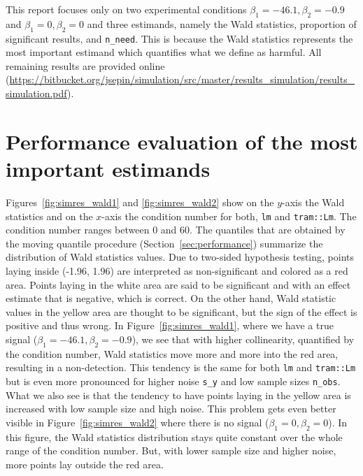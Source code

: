 \documentclass[11pt,a4paper,twoside]{book}\usepackage[]{graphicx}\usepackage[]{xcolor}
\begin{document}
This report focuses only on two experimental conditions $\beta_1=-46.1,\beta_2=-0.9$ and $\beta_1=0,\beta_2=0$ and three estimands, namely the Wald statistics, proportion of significant results, and \texttt{n\_need}.
This is because the Wald statistics represents the most important estimand which quantifies what we define as harmful.
All remaining results are provided online (\url{https://bitbucket.org/jsepin/simulation/src/master/results_simulation/results_simulation.pdf}).

\section{Performance evaluation of the most important estimands}
Figures~\ref{fig:simres_wald1} and \ref{fig:simres_wald2} show on the $y$-axis the Wald statistics and on the $x$-axis the condition number for both, \texttt{lm} and \texttt{tram::Lm}.
The condition number ranges between 0 and 60.
The quantiles that are obtained by the moving quantile procedure (Section~\ref{sec:performance}) summarize the distribution of Wald statistics values.
Due to two-sided hypothesis testing, points laying inside (-1.96, 1.96) are interpreted as non-significant and colored as a red area.
Points laying in the white area are said to be significant and with an effect estimate that is negative, which is correct. On the other hand, Wald statistic values in the yellow area are thought to be significant, but the sign of the effect is positive and thus wrong.
In Figure~\ref{fig:simres_wald1}, where we have a true signal ($\beta_1=-46.1,\beta_2=-0.9$), we see that with higher collinearity, quantified by the condition number, Wald statistics move more and more into the red area, resulting in a non-detection. This tendency is the same for both \texttt{lm} and \texttt{tram::Lm} but is even more pronounced for higher noise \texttt{s\_y} and low sample sizes \texttt{n\_obs}. What we also see is that the tendency to have points laying in the yellow area is increased with low sample size and high noise. 
This problem gets even better visible in Figure~\ref{fig:simres_wald2} where there is no signal ($\beta_1=0,\beta_2=0$).
In this figure, the Wald statistics distribution stays quite constant over the whole range of the condition number. But, with lower sample size and higher noise, more points lay outside the red area.
\end{document}
